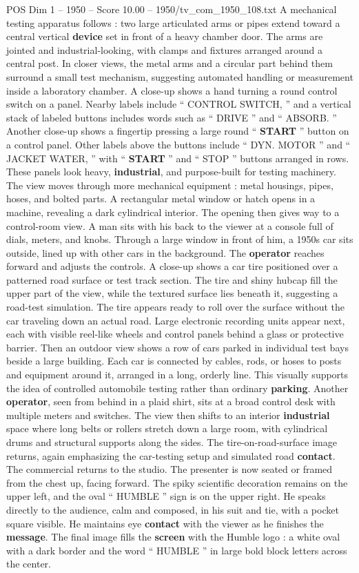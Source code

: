 \begin{textsample}{POS Dim 1 – 1950 – Score 10.00 – 1950/tv\_com\_1950\_108.txt}
A mechanical testing apparatus follows : two large articulated arms or pipes extend toward a central vertical \textbf{device} set in front of a heavy chamber door.
The arms are jointed and industrial-looking, with clamps and fixtures arranged around a central post.
In closer views, the metal arms and a circular part behind them surround a small test mechanism, suggesting automated handling or measurement inside a laboratory chamber.
A close-up shows a hand turning a round control switch on a panel.
Nearby labels include “ CONTROL SWITCH, ” and a vertical stack of labeled buttons includes words such as “ DRIVE ” and “ ABSORB. ” Another close-up shows a fingertip pressing a large round “ \textbf{START} ” button on a control panel.
Other labels above the buttons include “ DYN.
MOTOR ” and “ JACKET WATER, ” with “ \textbf{START} ” and “ STOP ” buttons arranged in rows.
These panels look heavy, \textbf{industrial}, and purpose-built for testing machinery.
The view moves through more mechanical equipment : metal housings, pipes, hoses, and bolted parts.
A rectangular metal window or hatch opens in a machine, revealing a dark cylindrical interior.
The opening then gives way to a control-room view.
A man sits with his back to the viewer at a console full of dials, meters, and knobs.
Through a large window in front of him, a 1950s car sits outside, lined up with other cars in the background.
The \textbf{operator} reaches forward and adjusts the controls.
A close-up shows a car tire positioned over a patterned road surface or test track section.
The tire and shiny hubcap fill the upper part of the view, while the textured surface lies beneath it, suggesting a road-test simulation.
The tire appears ready to roll over the surface without the car traveling down an actual road.
Large electronic recording units appear next, each with visible reel-like wheels and control panels behind a glass or protective barrier.
Then an outdoor view shows a row of cars parked in individual test bays beside a large building.
Each car is connected by cables, rods, or hoses to posts and equipment around it, arranged in a long, orderly line.
This visually supports the idea of controlled automobile testing rather than ordinary \textbf{parking}.
Another \textbf{operator}, seen from behind in a plaid shirt, sits at a broad control desk with multiple meters and switches.
The view then shifts to an interior \textbf{industrial} space where long belts or rollers stretch down a large room, with cylindrical drums and structural supports along the sides.
The tire-on-road-surface image returns, again emphasizing the car-testing setup and simulated road \textbf{contact}.
The commercial returns to the studio.
The presenter is now seated or framed from the chest up, facing forward.
The spiky scientific decoration remains on the upper left, and the oval “ HUMBLE ” sign is on the upper right.
He speaks directly to the audience, calm and composed, in his suit and tie, with a pocket square visible.
He maintains eye \textbf{contact} with the viewer as he finishes the \textbf{message}.
The final image fills the \textbf{screen} with the Humble logo : a white oval with a dark border and the word “ HUMBLE ” in large bold block letters across the center.


\end{textsample}
